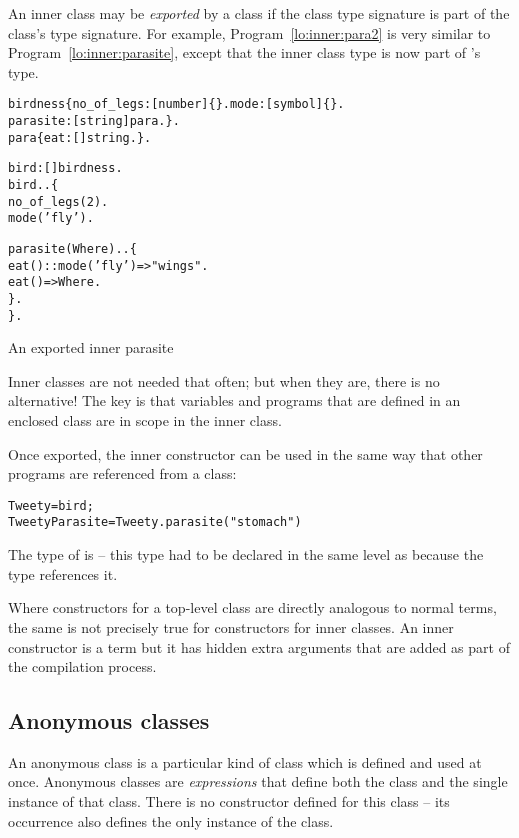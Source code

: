 An inner class may be \emph{exported} by a class if the class type signature is part of the class's type signature. For example, Program~\vref{lo:inner:para2} is very similar to Program~\ref{lo:inner:parasite}, except that the inner class type is now part of 's type.
\begin{program}
\vspace{0.5ex}
\begin{boxed}
\begin{alltt}
birdness \impl \{ no_of_legs:[number]\{\}. mode:[symbol]\{\}.
    parasite:[string]\conarrow{}para. \}.
para\impl{}\{ eat:[]\funarrow{}string. \}.

bird:[]\conarrow{}birdness.
bird..\{
  no_of_legs(2).
  mode('fly').
  
  parasite(Where)..\{
    eat()::mode('fly')=>"wings".
    	eat()=>Where.
  \}.
\}.
\end{alltt}
\end{boxed}
\vspace{-2ex}
\caption{An exported inner parasite}
\label{lo:inner:para2}
\end{program}
\begin{aside}
Inner classes are not needed that often; but when they are, there is no alternative! The key is that variables and programs that are defined in an enclosed class are in scope in the inner class.
\end{aside}
Once exported, the inner constructor can be used in the same way that other programs are referenced from a class:
\begin{alltt}
Tweety = bird;
TweetyParasite = Tweety.parasite("stomach")
\end{alltt}
The type of  is  -- this type had to be declared in the same level as  because the  type references it.
\begin{aside}
Where constructors for a top-level class are directly analogous to normal \prolog terms, the same is not precisely true for constructors for inner classes. An inner constructor is a term but it has hidden extra arguments that are added as part of the compilation process.
\end{aside}




\subsection{Anonymous classes}
\label{lo:anonymous}
An anonymous class is a particular kind of class which is defined and used at once. Anonymous classes are \emph{expressions} that define both the class and the single instance of that class. There is no constructor defined for this class -- its occurrence also defines the only instance of the class.

